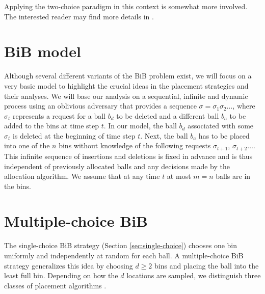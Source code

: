\documentclass[a4paper,12pt]{article}
\begin{document}
Applying the two-choice paradigm in this context is somewhat more involved. The interested reader may find more details in \cite{CMM+98}.

\section{BiB model}
\label{sec:model}
Although several different variants of the BiB problem exist, we will focus on a very basic model to highlight the crucial ideas in the placement strategies and their analyses. We will base our analysis on a sequential, infinite and dynamic process using an oblivious adversary that provides a sequence $\sigma = \sigma_1 \sigma_2 \dots$, where $\sigma_t$ represents a request for a ball $b_d$ to be deleted and a different ball $b_a$ to be added to the bins at time step $t$. In our model, the ball $b_d$ associated with some $\sigma_t$ is deleted at the beginning of time step $t$. Next, the ball $b_a$ has to be placed into one of the $n$ bins without knowledge of the following requests $\sigma_{t+1}$, $\sigma_{t+2}\dots$. This infinite sequence of insertions and deletions is fixed in advance and is thus independent of previously allocated balls and any decisions made by the allocation algorithm. We assume that at any time $t$ at most $m = n$ balls are in the bins.

\section{Multiple-choice BiB}
\label{sec:multiple-choice}
The single-choice BiB strategy (Section \ref{sec:single-choice}) chooses one bin uniformly and independently at random for each ball. A multiple-choice BiB strategy generalizes this idea by  choosing $d \geq 2$ bins and placing the ball into the least full bin. Depending on how the $d$ locations are sampled, we distinguish three classes of placement algorithms \cite{VOC03}. 
\end{document}
